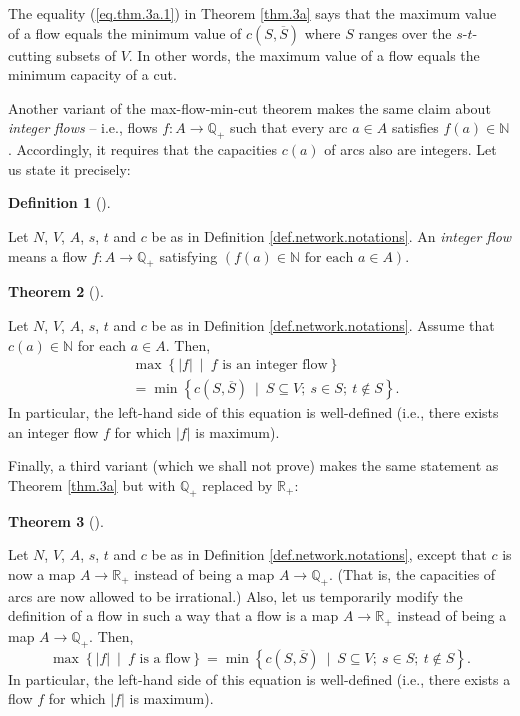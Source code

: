 \documentclass[numbers=enddot,12pt,final,onecolumn,notitlepage]{scrartcl}%
\theoremstyle{definition}
\newtheorem{theo}{Theorem}[section]
\newenvironment{theorem}[1][]
{\begin{theo}[#1]\begin{leftbar}}
{\end{leftbar}\end{theo}}
\newtheorem{defi}[theo]{Definition}
\newenvironment{definition}[1][]
{\begin{defi}[#1]\begin{leftbar}}
{\end{leftbar}\end{defi}}
\begin{document}
The equality (\ref{eq.thm.3a.1}) in Theorem \ref{thm.3a} says that the maximum
value of a flow equals the minimum value of $c\left(  S,\overline{S}\right)  $
where $S$ ranges over the $s$-$t$-cutting subsets of $V$. In other words, the
maximum value of a flow equals the minimum capacity of a cut.

Another variant of the max-flow-min-cut theorem makes the same claim about
\textit{integer flows} -- i.e., flows $f:A\rightarrow\mathbb{Q}_{+}$ such that
every arc $a\in A$ satisfies $f\left(  a\right)  \in\mathbb{N}$. Accordingly,
it requires that the capacities $c\left(  a\right)  $ of arcs also are
integers. Let us state it precisely:

\begin{definition}
Let $N$, $V$, $A$, $s$, $t$ and $c$ be as in Definition
\ref{def.network.notations}. An \textit{integer flow} means a flow
$f:A\rightarrow\mathbb{Q}_{+}$ satisfying $\left(  f\left(  a\right)
\in\mathbb{N}\text{ for each }a\in A\right)  $.
\end{definition}

\begin{theorem}
\label{thm.3b}Let $N$, $V$, $A$, $s$, $t$ and $c$ be as in Definition
\ref{def.network.notations}. Assume that $c\left(  a\right)  \in\mathbb{N}$
for each $a\in A$. Then,%
\begin{align*}
&  \max\left\{  \left\vert f\right\vert \ \mid\ f\text{ is an integer
flow}\right\} \\
&  =\min\left\{  c\left(  S,\overline{S}\right)  \ \mid\ S\subseteq V;\ s\in
S;\ t\notin S\right\}  .
\end{align*}
In particular, the left-hand side of this equation is well-defined (i.e.,
there exists an integer flow $f$ for which $\left\vert f\right\vert $ is maximum).
\end{theorem}

Finally, a third variant (which we shall not prove) makes the same statement
as Theorem \ref{thm.3a} but with $\mathbb{Q}_{+}$ replaced by $\mathbb{R}_{+}$:

\begin{theorem}
\label{thm.3c}Let $N$, $V$, $A$, $s$, $t$ and $c$ be as in Definition
\ref{def.network.notations}, except that $c$ is now a map $A\rightarrow
\mathbb{R}_{+}$ instead of being a map $A\rightarrow\mathbb{Q}_{+}$. (That is,
the capacities of arcs are now allowed to be irrational.) Also, let us
temporarily modify the definition of a flow in such a way that a flow is a map
$A\rightarrow\mathbb{R}_{+}$ instead of being a map $A\rightarrow
\mathbb{Q}_{+}$. Then,%
\[
\max\left\{  \left\vert f\right\vert \ \mid\ f\text{ is a flow}\right\}
=\min\left\{  c\left(  S,\overline{S}\right)  \ \mid\ S\subseteq V;\ s\in
S;\ t\notin S\right\}  .
\]
In particular, the left-hand side of this equation is well-defined (i.e.,
there exists a flow $f$ for which $\left\vert f\right\vert $ is maximum).
\end{theorem}
\end{document}
